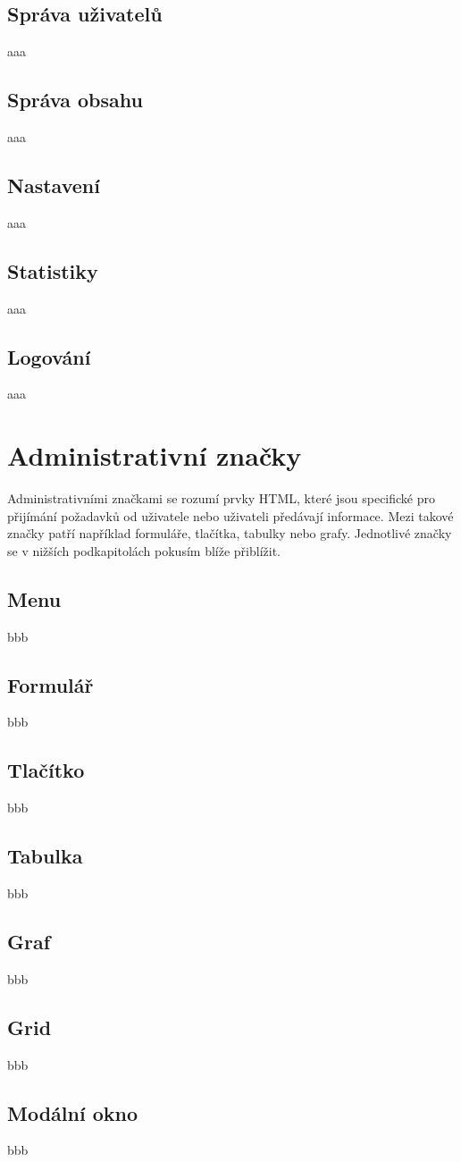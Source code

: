 \subsection{Správa uživatelů}
\label{subsec:admin-elements-user-management}
aaa

\subsection{Správa obsahu}
\label{subsec:admin-elements-content-management}
aaa

\subsection{Nastavení}
\label{subsec:admin-elements-settings}
aaa

\subsection{Statistiky}
\label{subsec:admin-elements-statistics}
aaa

\subsection{Logování}
\label{subsec:admin-elements-logs}
aaa

\section{Administrativní značky}
\label{sec:admin-tags}
Administrativními značkami se rozumí prvky HTML, které jsou specifické pro přijímání požadavků od uživatele nebo uživateli předávají informace. Mezi takové značky patří například formuláře, tlačítka, tabulky nebo grafy. Jednotlivé značky se v nižších podkapitolách pokusím blíže přiblížit.

\subsection{Menu}
\label{subsec:admin-tags-menu}
bbb

\subsection{Formulář}
\label{subsec:admin-tags-form}
bbb

\subsection{Tlačítko}
\label{subsec:admin-tags-button}
bbb

\subsection{Tabulka}
\label{subsec:admin-tags-table}
bbb

\subsection{Graf}
\label{subsec:admin-tags-chart}
bbb

\subsection{Grid}
\label{subsec:admin-tags-grid}
bbb

\subsection{Modální okno}
\label{subsec:admin-tags-modal}
bbb